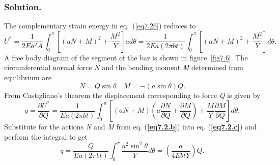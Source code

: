 \documentclass{AeroStructure-ERJohnson}
\begin{document}
\begin{example}
\subsubsection{Solution.}
The complementary strain energy in eq.~(\ref{eq7.26}) reduces to
\begin{equation}
U^{*}=\frac{1}{2 E a^{2} A} \int_{0}^{\pi}\left[(a N+M)^{2}+\frac{M^{2}}{Y}\right] a d \theta=\frac{1}{2 E a(2 \pi b t)} \int_{0}^{\pi}\left[(a N+M)^{2}+\frac{M^{2}}{Y}\right] d \theta. \label{eq7.2.a}\tag{a}
\end{equation}
A free body diagram of the segment of the bar is shown in figure~\ref{fig7.6}. The circumferential normal force \textit{N} and the bending moment \textit{M} determined from equilibrium are
{\def\thefigure{7.6}
}
\vspace*{-2\baselineskip}
\begin{equation}
N=Q \sin \theta \quad M=-(a \sin \theta) Q. \label{eq7.2.b}\tag{b}
\end{equation}
From Castigliano's theorem the displacement corresponding to force \textit{Q} is given by
\begin{equation}
q=\frac{\partial U^{*}}{\partial Q}=\frac{1}{E a(2 \pi b t)} \int_{0}^{\pi}\left[(a N+M)\left(a \frac{\partial N}{\partial Q}+\frac{\partial M}{\partial Q}\right)+\frac{M}{Y} \frac{\partial M}{\partial Q}\right] d \theta. \label{eq7.2.c}\tag{c}
\end{equation}
Substitute for the actions \textit{N} and \textit{M} from eq. (\textbf{\ref{eq7.2.b}}) into eq. (\textbf{\ref{eq7.2.c}}) and perform the integral to get
\begin{equation}
q=\frac{Q}{E a(2 \pi b t)} \int_{0}^{\pi} \frac{a^{2} \sin ^{2} \theta}{Y} d \theta=\left(\frac{a}{4 E b t Y}\right) Q. \label{eq7.2.d}\tag{d}
\end{equation}
\vspace*{4pt}
\clearpage


\end{example}
\end{document}
